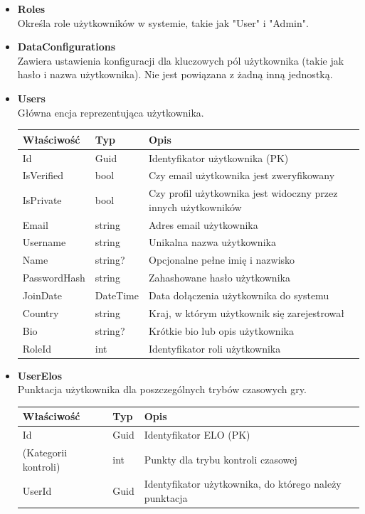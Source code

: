 \documentclass[twoside]{projektInzynierskiMS1}
\begin{document}
\begin{itemize}
    \item \textbf{Roles}\\
    Określa role użytkowników w systemie, takie jak "User" i "Admin".

    \item \textbf{DataConfigurations}\\
    Zawiera ustawienia konfiguracji dla kluczowych pól użytkownika (takie jak hasło i nazwa użytkownika). Nie jest powiązana z żadną inną jednostką.

    \item \textbf{Users}\\
    Główna encja reprezentująca użytkownika.
    \renewcommand{\arraystretch}{1.2}
    \begin{longtable}{|m{4cm}|m{2cm}|m{8cm}|}
        \hline
        \rowcolor{lightgray}
        \textbf{Właściwość} & \textbf{Typ} & \textbf{Opis} \\ \hline
        \endhead
        \hline
        Id & Guid & Identyfikator użytkownika (PK) \\ \hline
        IsVerified & bool & Czy email użytkownika jest zweryfikowany \\ \hline
        IsPrivate & bool & Czy profil użytkownika jest widoczny przez innych użytkowników \\ \hline
        Email & string & Adres email użytkownika \\ \hline
        Username & string & Unikalna nazwa użytkownika \\ \hline
        Name & string? & Opcjonalne pełne imię i nazwisko \\ \hline
        PasswordHash & string & Zahashowane hasło użytkownika \\ \hline
        JoinDate & DateTime & Data dołączenia użytkownika do systemu \\ \hline
        Country & string & Kraj, w którym użytkownik się zarejestrował \\ \hline
        Bio & string? & Krótkie bio lub opis użytkownika \\ \hline
        RoleId & int & Identyfikator roli użytkownika\\ \hline
    \end{longtable}

    \item \textbf{UserElos}\\
    Punktacja użytkownika dla poszczególnych trybów czasowych gry.
    \renewcommand{\arraystretch}{1.2}
    \begin{longtable}{|m{4cm}|m{2cm}|m{8cm}|}
        \hline
        \rowcolor{lightgray}
        \textbf{Właściwość} & \textbf{Typ} & \textbf{Opis} \\ \hline
        \endhead
        \hline
        Id & Guid & Identyfikator ELO (PK) \\ \hline
        (Kategorii kontroli) & int & Punkty dla trybu kontroli czasowej \\ \hline
        UserId & Guid & Identyfikator użytkownika, do którego należy punktacja \\ \hline
    \end{longtable}


\end{itemize}
\end{document}
